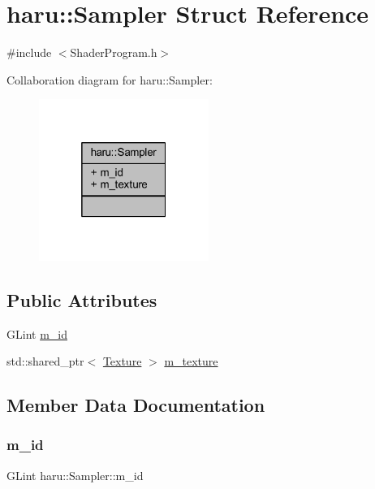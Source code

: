 \hypertarget{structharu_1_1_sampler}{}\section{haru\+:\+:Sampler Struct Reference}
\label{structharu_1_1_sampler}


{\ttfamily \#include $<$Shader\+Program.\+h$>$}



Collaboration diagram for haru\+:\+:Sampler\+:\nopagebreak
\begin{figure}[H]
\begin{center}
\leavevmode
\includegraphics[width=157pt]{structharu_1_1_sampler__coll__graph}
\end{center}
\end{figure}
\subsection*{Public Attributes}
\begin{DoxyCompactItemize}
\item 
G\+Lint \mbox{\hyperlink{structharu_1_1_sampler_a363e0a0661392660270c1fdc356dcee7}{m\+\_\+id}}
\item 
std\+::shared\+\_\+ptr$<$ \mbox{\hyperlink{classharu_1_1_texture}{Texture}} $>$ \mbox{\hyperlink{structharu_1_1_sampler_a63c7dfdf6db2dd4ab18c1014ff7044af}{m\+\_\+texture}}
\end{DoxyCompactItemize}


\subsection{Member Data Documentation}
\mbox{\label{structharu_1_1_sampler_a363e0a0661392660270c1fdc356dcee7}} 
\subsubsection{\texorpdfstring{m\+\_\+id}{m\_id}}
{\footnotesize\ttfamily G\+Lint haru\+::\+Sampler\+::m\+\_\+id}

